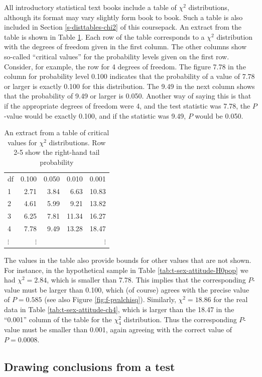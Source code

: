 \documentclass[11pt,a4paper,openany]{book}
\begin{document}
All introductory statistical text books include a table of \(\chi^{2}\)
distributions, although its format may vary slightly form book to book.
Such a table is also included in Section \ref{s-disttables-chi2} of this
coursepack. An extract from the table is shown in Table
\ref{tab:t-chi2table}. Each row of the table corresponds to a
\(\chi^{2}\) distribution with the degrees of freedom given in the first
column. The other columns show so-called ``critical values'' for the
probability levels given on the first row. Consider, for example, the
row for 4 degrees of freedom. The figure 7.78 in the column for
probability level 0.100 indicates that the probability of a value of
7.78 or larger is exactly 0.100 for this distribution. The 9.49 in the
next column shows that the probability of 9.49 or larger is 0.050.
Another way of saying this is that if the appropriate degrees of freedom
were 4, and the test statistic was 7.78, the \(P\)-value would be
exactly 0.100, and if the statistic was 9.49, \(P\) would be 0.050.

\begin{longtable}[]{@{}lrrrr@{}}
\caption{\label{tab:t-chi2table} An extract from a table of critical values
for \(\chi^{2}\) distributions. Row 2-5 show the right-hand tail
probability}\tabularnewline
\toprule
df & 0.100 & 0.050 & 0.010 & 0.001\tabularnewline
1 & 2.71 & 3.84 & 6.63 & 10.83\tabularnewline
2 & 4.61 & 5.99 & 9.21 & 13.82\tabularnewline
3 & 6.25 & 7.81 & 11.34 & 16.27\tabularnewline
4 & 7.78 & 9.49 & 13.28 & 18.47\tabularnewline
\(\vdots\) & \(\vdots\) & & & \(\vdots\)\tabularnewline
\bottomrule
\end{longtable}

The values in the table also provide bounds for other values that are
not shown. For instance, in the hypothetical sample in Table
\ref{tab:t-sex-attitude-H0pop} we had \(\chi^{2}=2.84\), which is
smaller than 7.78. This implies that the corresponding \(P\)-value must
be larger than 0.100, which (of course) agrees with the precise value of
\(P=0.585\) (see also Figure \ref{fig:f-pvalchisq}). Similarly,
\(\chi^{2}=18.86\) for the real data in Table
\ref{tab:t-sex-attitude-ch4}, which is larger than the 18.47 in the
``0.001'' column of the table for the \(\chi^{2}_{4}\) distribution.
Thus the corresponding \(P\)-value must be smaller than 0.001, again
agreeing with the correct value of \(P=0.0008\).

\subsection{Drawing conclusions from a
test}\label{ss-tables-chi2test-conclusions}
\end{document}
